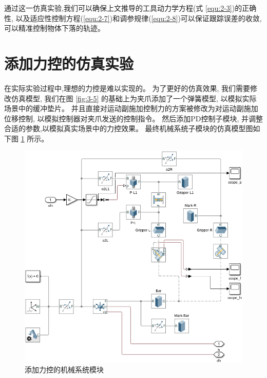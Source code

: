 通过这一仿真实验,我们可以确保上文推导的工具动力学方程(式 \ref{equ:2-3})的正确性,
以及适应性控制方程(\ref{equ:2-7})和调参规律(\ref{equ:2-8})可以保证跟踪误差的收敛,
可以精准控制物体下落的轨迹。


\section{添加力控的仿真实验}
在实际实验过程中,理想的力控是难以实现的。
为了更好的仿真效果, 我们需要修改仿真模型,
我们在图 \ref{fig:3-5} 的基础上为夹爪添加了一个弹簧模型, 以模拟实际场景中的缓冲垫片。
并且直接对运动副施加控制力的方案被修改为对运动副施加位移控制,
以模拟控制器对夹爪发送的控制指令。
然后添加PD控制子模块, 并调整合适的参数,以模拟真实场景中的力控效果。
最终机械系统子模块的仿真模型图如下图 \ref{fig:mech_x} 所示。

\begin{figure}[!ht]
  \centering
  \includegraphics[width=13.5cm]{chapter04/pic/mech_x}
  \caption{\label{fig:mech_x}
    添加力控的机械系统模块}
  \vspace{-0.3cm}
\end{figure}

